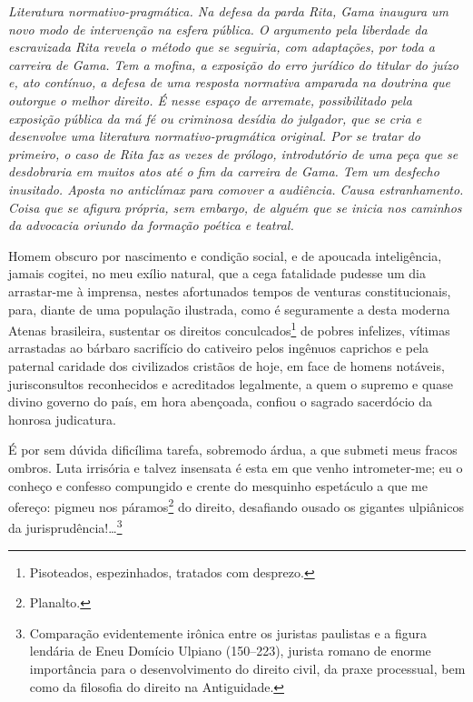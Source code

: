 \begin{didascalia}\itshape
Literatura normativo-pragmática. Na defesa da parda Rita, Gama inaugura
um novo modo de intervenção na esfera pública. O argumento pela
liberdade da escravizada Rita revela o método que se seguiria, com
adaptações, por toda a carreira de Gama. Tem a mofina, a exposição do
erro jurídico do titular do juízo e, ato contínuo, a defesa de uma
resposta normativa amparada na doutrina que outorgue o melhor direito. É
nesse espaço de arremate, possibilitado pela exposição pública da má fé
ou criminosa desídia do julgador, que se cria e desenvolve uma
literatura normativo-pragmática original. Por se tratar do primeiro, o
caso de Rita faz as vezes de prólogo, introdutório de uma peça que se
desdobraria em muitos atos até o fim da carreira de Gama. Tem um
desfecho inusitado. Aposta no anticlímax para comover a audiência. Causa
estranhamento. Coisa que se afigura própria, sem embargo, de alguém que
se inicia nos caminhos da advocacia oriundo da formação poética e
teatral.
\end{didascalia}



Homem obscuro por nascimento e condição social, e de apoucada
inteligência, jamais cogitei, no meu exílio natural, que a cega
fatalidade pudesse um dia arrastar-me à imprensa, nestes afortunados
tempos de venturas constitucionais, para, diante de uma população
ilustrada, como é seguramente a desta moderna Atenas brasileira,
sustentar os direitos conculcados\footnote{Pisoteados, espezinhados,
  tratados com desprezo.} de pobres infelizes, vítimas arrastadas ao
bárbaro sacrifício do cativeiro pelos ingênuos caprichos e pela paternal
caridade dos civilizados cristãos de hoje, em face de homens notáveis,
jurisconsultos reconhecidos e acreditados legalmente, a quem o supremo e
quase divino governo do país, em hora abençoada, confiou o sagrado
sacerdócio da honrosa judicatura.

É por sem dúvida dificílima tarefa, sobremodo árdua, a que submeti meus
fracos ombros. Luta irrisória e talvez insensata é esta em que venho
intrometer-me; eu o conheço e confesso compungido e crente do mesquinho
espetáculo a que me ofereço: pigmeu nos páramos\footnote{Planalto.} do
direito, desafiando ousado os gigantes ulpiânicos da
jurisprudência!\ldots{}\footnote{Comparação evidentemente irônica entre os
  juristas paulistas e a figura lendária de Eneu Domício Ulpiano
  (150--223), jurista romano de enorme importância para o desenvolvimento
  do direito civil, da praxe processual, bem como da filosofia do
  direito na Antiguidade.}

